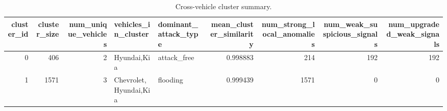 \begin{table}[t]
\centering
\begin{tabular}{rrrllrrrr}
\toprule
cluster\_id & cluster\_size & num\_unique\_vehicles & vehicles\_in\_cluster & dominant\_attack\_type & mean\_cluster\_similarity & num\_strong\_local\_anomalies & num\_weak\_suspicious\_signals & num\_upgraded\_weak\_signals \\
\midrule
0 & 406 & 2 & Hyundai,Kia & attack\_free & 0.998883 & 214 & 192 & 192 \\
1 & 1571 & 3 & Chevrolet,Hyundai,Kia & flooding & 0.999439 & 1571 & 0 & 0 \\
\bottomrule
\end{tabular}
\caption{Cross-vehicle cluster summary.}
\label{tab:cross-vehicle}
\end{table}
